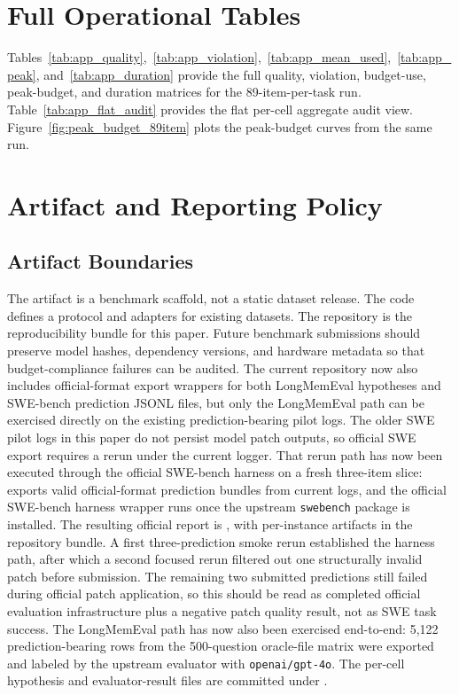 \documentclass[11pt]{article}
\begin{document}
\section{Full Operational Tables}

Tables~\ref{tab:app_quality},~\ref{tab:app_violation},~\ref{tab:app_mean_used},~\ref{tab:app_peak}, and~\ref{tab:app_duration}
provide the full quality, violation, budget-use, peak-budget, and duration
matrices for the 89-item-per-task run.  Table~\ref{tab:app_flat_audit}
provides the flat per-cell aggregate audit view.  Figure~\ref{fig:peak_budget_89item}
plots the peak-budget curves from the same run.



\section{Artifact and Reporting Policy}

\subsection{Artifact Boundaries}

The artifact is a benchmark scaffold, not a static dataset release.  The code
defines a protocol and adapters for existing datasets.  The repository is the
reproducibility bundle for this paper.  Future benchmark submissions should
preserve model hashes, dependency versions, and hardware metadata so that
budget-compliance failures can be audited.
The current repository now also includes official-format export wrappers for
both LongMemEval hypotheses and SWE-bench prediction JSONL files, but only the
LongMemEval path can be exercised directly on the existing prediction-bearing
pilot logs.  The older SWE pilot logs in this paper do not persist model patch
outputs, so official SWE export requires a rerun under the current logger.
That rerun path has now been executed through the official SWE-bench harness on
a fresh three-item slice:
 exports valid official-format
prediction bundles from current logs, and the official SWE-bench harness
wrapper runs once the upstream \texttt{swebench} package is installed.  The
resulting official report is
, with per-instance
artifacts in the repository bundle.  A
first three-prediction smoke rerun established the harness path, after which a
second focused rerun filtered out one structurally invalid patch before
submission.  The remaining two submitted predictions still failed during
official patch application, so this should be read as completed official
evaluation infrastructure plus a negative patch quality result, not as SWE task
success.  The LongMemEval path has now also been exercised end-to-end: 5,122
prediction-bearing rows from the 500-question oracle-file matrix were exported
and labeled by the upstream evaluator with \texttt{openai/gpt-4o}.  The
per-cell hypothesis and evaluator-result files are committed under
.
\end{document}

